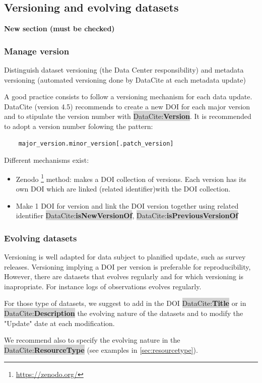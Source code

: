 \documentclass[11pt,a4paper]{ivoa}
\newcommand{\dataciteterm}[1]{\colorbox{lightgray}{DataCite:\textbf{#1}}}
\begin{document}
\subsection{Versioning and evolving datasets}
\label{sec:version}
\textbf{\color{red}New section (must be checked)}

\subsubsection{Manage version}
Distinguish dataset versioning (the Data Center responsibility) and metadata versioning (automated versioning done by DataCite at each metadata update)

A good practice consists to follow a versioning mechanism for each data update. DataCite (version 4.5) recommends to create a new DOI for each major version and to stipulate the version number with \dataciteterm{Version}. 
It is recommended to adopt a version number folowing the pattern:
\begin{verbatim}
	major_version.minor_version[.patch_version]
\end{verbatim}


Different mechanisms exist:
\begin{itemize}
\item  Zenodo \footnote{\url{https://zenodo.org/}} method: makes a DOI collection of versions. Each version has its own DOI which are linked (related identifier)with the DOI collection.
\item Make 1 DOI for version and link the DOI version together using related identifier \dataciteterm{isNewVersionOf}, \dataciteterm{isPreviousVersionOf}
\end{itemize}

\subsubsection{Evolving datasets}
\label{sec:evolving}
Versioning is well adapted for data subject to planified update, such as survey releases. Versioning implying a DOI per version is preferable for reproducibility, 
However, there are datasets that evolves regularly and for which versioning is inapropriate. For instance logs of observations evolves regularly.


For those type of datasets, we suggest to add in the DOI \dataciteterm{Title} or in \dataciteterm{Description} the evolving nature of the datasets and to modify the "Update" date at each modification.

We recommend also to specify the evolving nature in the \dataciteterm{ResourceType} (see examples in \ref{sec:resourcetype}).\\
\end{document}
